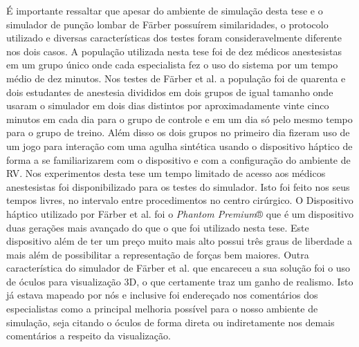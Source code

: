 É importante ressaltar que apesar do ambiente de simulação desta tese e o simulador de punção lombar de Färber \cite{Farber2008} possuírem similaridades, o protocolo utilizado e diversas características dos testes foram consideravelmente diferente nos dois casos. A população utilizada nesta tese foi de dez médicos anestesistas em um grupo único onde cada especialista fez o uso do sistema por um tempo médio de dez minutos. Nos testes de Färber et al. \cite{Farber2008} a população foi de quarenta e dois estudantes de anestesia divididos em dois grupos de igual tamanho onde usaram o simulador em dois dias distintos por aproximadamente vinte cinco minutos em cada dia para o grupo de controle e em um dia só pelo mesmo tempo para o grupo de treino. Além disso os dois grupos no primeiro dia fizeram uso de um jogo para interação com uma agulha sintética usando o dispositivo háptico de forma a se familiarizarem com o dispositivo e com a configuração do ambiente de \acrshort{RV}. Nos experimentos desta tese um tempo limitado de acesso aos médicos anestesistas foi disponibilizado para os testes do simulador. Isto foi feito nos seus tempos livres, no intervalo entre procedimentos no centro cirúrgico.
O Dispositivo háptico utilizado por Färber et al. \cite{Farber2008} foi o \textit{Phantom Premium}® que é um dispositivo duas gerações mais avançado do que o que foi utilizado nesta tese. Este dispositivo além de ter um preço muito mais alto possui três graus de liberdade a mais além de possibilitar a representação de forças bem maiores. Outra característica do simulador de Färber et al. \cite{Farber2008} que encareceu a sua solução foi o uso de óculos para visualização 3D, o que certamente traz um ganho de realismo. Isto já estava mapeado por nós e inclusive foi endereçado nos comentários dos especialistas como a principal melhoria possível para o nosso ambiente de simulação, seja citando o óculos de forma direta ou indiretamente nos demais comentários a respeito da visualização. 


